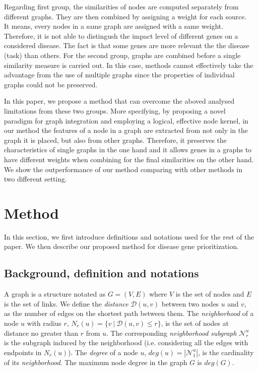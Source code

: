 Regarding first group, the similarities of nodes are computed separately from different graphs. They are then combined by assigning a weight for each source. It means, every nodes in a same graph are assigned with a same weight. Therefore, it is not able to distingush the impact level of different genes on a considered disease. The fact is that some genes are more relevant the the disease (task) than others. For the second group, graphs are combined before a single similarity measure is carried out. In this case, methods cannot effectively take the advantage from the use of multiple graphs since the properties of individual graphs could not be preserved.

In this paper, we propose a method that can overcome the aboved analysed limitations from these two groups. More specifying, by proposing a novel paradigm for graph integration and employing a logical, effective node kernel, in our method the features of a node in a graph are extracted from not only in the graph it is placed, but also from other graphs. Therefore, it preserves the characteristics of single graphs in the one hand and it allows genes in a graphs to have different weights when combining for the final similarities on the other hand. We show the outperformance of our method comparing with other methods in two different setting.
\section{Method}
In this section, we first introduce definitions and notations used for the rest of the paper. We then describe our proposed method for disease gene prioritization.

\subsection{Background, definition and notations}
A graph is a structure notated as $G=(V,E)$ where $V$ is the set of nodes and $E$ is the set of links. We define the \textit{distance} $\mathcal{D}(u,v)$ between two nodes $u$ and $v$, as the number of edges on the shortest path between them. The \textit{neighborhood} of a node $u$ with radius $r$, $N_r(u) = \lbrace v\ |\ \mathcal{D}(u,v) \leq r \rbrace$, is the set of nodes at distance no greater than $r$ from $u$. The corresponding \textit{neighborhood subgraph} $\mathcal{N}_{r}^{u}$ is the  subgraph induced by the neighborhood (i.e. considering all the edges with endpoints in $N_r(u)$). The \textit{degree} of a node $u$, $deg(u) = |\mathcal{N}_{1}^{u}|$, is the cardinality of its \textit{neighborhood}. The maximum node degree in the graph $G$ is $deg(G)$.

